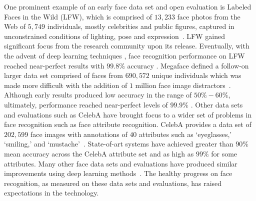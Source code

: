 \documentclass[letterpaper,11pt]{article}
\begin{document}
One prominent example of an early face data set and open evaluation is Labeled Faces in the Wild (LFW), which is comprised of $13,233$ face photos from the Web of $5,749$ individuals, mostly celebrities and public figures, captured in unconstrained conditions of lighting, pose and expression~\cite{LFW_Tech07}.  LFW gained significant focus from the research community upon its release.  Eventually, with the advent of deep learning techniques \cite{krizhevsky2012imagenet,taigman2014deepface}, face recognition performance on LFW reached near-perfect results with $99.8\%$ accuracy \cite{LFWlink,liu2015targeting}.  Megaface defined a follow-on larger data set comprised of faces from $690,572$ unique individuals which was made more difficult with the addition of $1$ million face image distractors~\cite{Megaface_CVPR16}.  Although early results produced low accuracy in the range of $50\%-60\%$, ultimately, performance reached near-perfect levels of $99.9\%$ \cite{megafacelink,deng2018arcface}.  Other data sets and evaluations such as CelebA have brought focus to a wider set of problems in face recognition such as face attribute recognition.  CelebA provides a data set of $202,599$ face images with annotations of $40$ attributes such as `eyeglasses,' `smiling,' and `mustache'~\cite{CelebA_ICCV15}.  State-of-art systems have achieved greater than $90\%$ mean accuracy across the CelebA attribute set and as high as $99\%$ for some attributes. Many other face data sets and evaluations have produced similar improvements using deep learning methods~\cite{MSCELEB1M_ECCV16,VGG2_FG18,VGG_BMVC15,imdbface_ECCV18,age_image18,CASIA_ARXIV14,UMDFaces_ARXIV16,CelebA_ICCV15,CACD_TMM15,IJB-C_ICB18,FaceScrub_ICIP14,IJB-B_CVPRW17,Adience_TIFS14,UTKface_CVPR17,AgeDB_CVPRW17,lfwplus_TPAMI17}.  The healthy progress on face recognition, as measured on these data sets and evaluations, has raised expectations in the technology.
\end{document}
